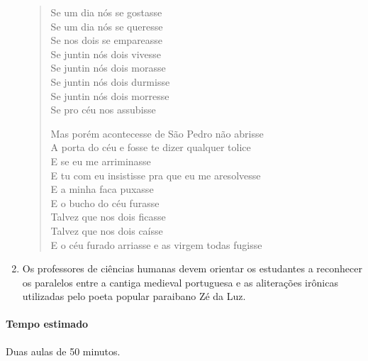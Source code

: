 \documentclass[12pt]{extarticle}
\begin{document}
\begin{enumerate}
\begin{verse}
    Se um dia nós se gostasse\\
    Se um dia nós se queresse\\
    Se nos dois se empareasse\\
    Se juntin nós dois vivesse\\
    Se juntin nós dois morasse\\
    Se juntin nós dois durmisse\\
    Se juntin nós dois morresse\\
    Se pro céu nos assubisse\\\medskip

    Mas porém acontecesse de São Pedro não abrisse\\
    A porta do céu e fosse te dizer qualquer tolice\\
    E se eu me arriminasse\\
    E tu com eu insistisse pra que eu me aresolvesse\\
    E a minha faca puxasse\\
    E o bucho do céu furasse\\
    Talvez que nos dois ficasse\\
    Talvez que nos dois caísse\\
    E o céu furado arriasse e as virgem todas fugisse\\
\end{verse}

\item Os professores de ciências humanas devem orientar os estudantes a reconhecer os paralelos entre a cantiga medieval portuguesa
 e as aliterações irônicas utilizadas pelo poeta popular paraibano Zé da Luz.

\end{enumerate}

\paragraph{Tempo estimado} Duas aulas de 50 minutos.


\begin{comment}
Na obra lida, é feita a oposição entre campo e cidade, e as
características das pessoas que habitam esses dois ambientes. Nesta
temática, do homem rural em oposição ao homem urbano, proponha aos
alunos, contando com o auxílio do professor de ciências humanas, a
criação de um mapa. Nele, inicialmente divida as regiões em
majoritariamente urbanas e rurais. Feito isso, aconselha-se buscar
notícias e estudos sobre as grandes desigualdades e os fatores do
deslocamento populacional para as grandes cidades. Com essa informação,
é possível indicar de maneira gráfica, valendo-se de setas por exemplos,
caso seja um painel físico, ou por recursos animados, caso o mapa esteja
sendo produzido virtualmente, os fluxos migratórios estudados. Como
fonte, também, sugere-se orientar a pesquisa por meio da obra de
Patativa do Assaré e de outros autores nordestinos.

Para complementar a obra, sugere-se criar xilogravuras a partir da
confecção de carimbos artesanais.
\end{comment}
\end{document}
